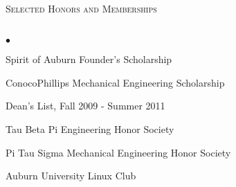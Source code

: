 \documentclass{article}
\newcommand{\lineunder} {
	\vspace*{-8pt} \\
	\hspace*{-18pt} \hrulefill \\
}
\newcommand{\header} [1] {
	{\hspace*{-15pt}\vspace*{6pt} \textsc{#1}} 
	\vspace*{-6pt} \lineunder
}
\newenvironment{achievements}{
	\begin{list}
		{$\bullet$}{\topsep 0pt \itemsep -2pt}}{\vspace*{4pt}
	\end{list}
}
\begin{document}

\header{Selected Honors and Memberships}

	\begin{achievements}
		\item Spirit of Auburn Founder's Scholarship
		\item ConocoPhillips Mechanical Engineering Scholarship
		\item Dean's List, Fall 2009 - Summer 2011
		\item Tau Beta Pi Engineering Honor Society
		\item Pi Tau Sigma Mechanical Engineering Honor Society
		\item Auburn University Linux Club
	\end{achievements}
\end{document}
